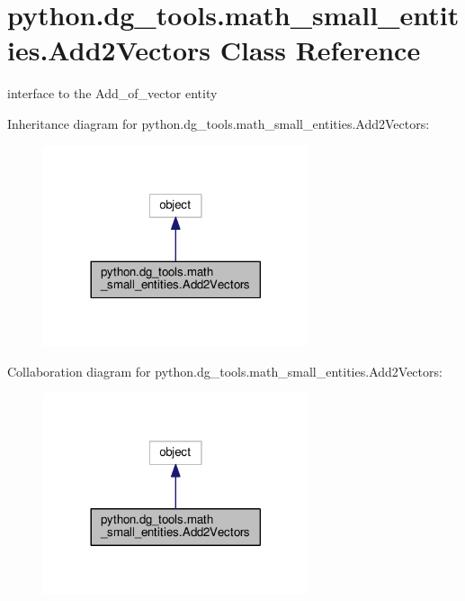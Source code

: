 \hypertarget{classpython_1_1dg__tools_1_1math__small__entities_1_1Add2Vectors}{}\section{python.\+dg\+\_\+tools.\+math\+\_\+small\+\_\+entities.\+Add2\+Vectors Class Reference}
\label{classpython_1_1dg__tools_1_1math__small__entities_1_1Add2Vectors}


interface to the Add\+\_\+of\+\_\+vector entity  




Inheritance diagram for python.\+dg\+\_\+tools.\+math\+\_\+small\+\_\+entities.\+Add2\+Vectors\+:
\nopagebreak
\begin{figure}[H]
\begin{center}
\leavevmode
\includegraphics[width=221pt]{classpython_1_1dg__tools_1_1math__small__entities_1_1Add2Vectors__inherit__graph}
\end{center}
\end{figure}


Collaboration diagram for python.\+dg\+\_\+tools.\+math\+\_\+small\+\_\+entities.\+Add2\+Vectors\+:
\nopagebreak
\begin{figure}[H]
\begin{center}
\leavevmode
\includegraphics[width=221pt]{classpython_1_1dg__tools_1_1math__small__entities_1_1Add2Vectors__coll__graph}
\end{center}
\end{figure}
